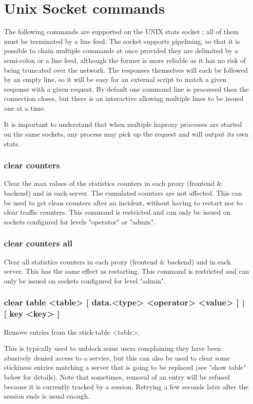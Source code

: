 \section{Unix Socket commands}

The following commands are supported on the UNIX stats socket ; all of them
must be terminated by a line feed. The socket supports pipelining, so that it
is possible to chain multiple commands at once provided they are delimited by
a semi-colon or a line feed, although the former is more reliable as it has no
risk of being truncated over the network. The responses themselves will each be
followed by an empty line, so it will be easy for an external script to match a
given response with a given request. By default one command line is processed
then the connection closes, but there is an interactive allowing multiple lines
to be issued one at a time.

It is important to understand that when multiple haproxy processes are started
on the same sockets, any process may pick up the request and will output its
own stats.

\subsubsection[clear counters]{clear counters}
  Clear the max values of the statistics counters in each proxy (frontend \&
  backend) and in each server. The cumulated counters are not affected. This
  can be used to get clean counters after an incident, without having to
  restart nor to clear traffic counters. This command is restricted and can
  only be issued on sockets configured for levels "operator" or "admin".

\subsubsection[clear counters all]{clear counters all}
  Clear all statistics counters in each proxy (frontend \& backend) and in each
  server. This has the same effect as restarting. This command is restricted
  and can only be issued on sockets configured for level "admin".

\subsubsection[clear table]{clear table <table> [ data.<type> <operator> <value> ] | [ key <key> ]}
  Remove entries from the stick-table <table>.

  This is typically used to unblock some users complaining they have been
  abusively denied access to a service, but this can also be used to clear some
  stickiness entries matching a server that is going to be replaced (see "show
  table" below for details).  Note that sometimes, removal of an entry will be
  refused because it is currently tracked by a session. Retrying a few seconds
  later after the session ends is usual enough.

